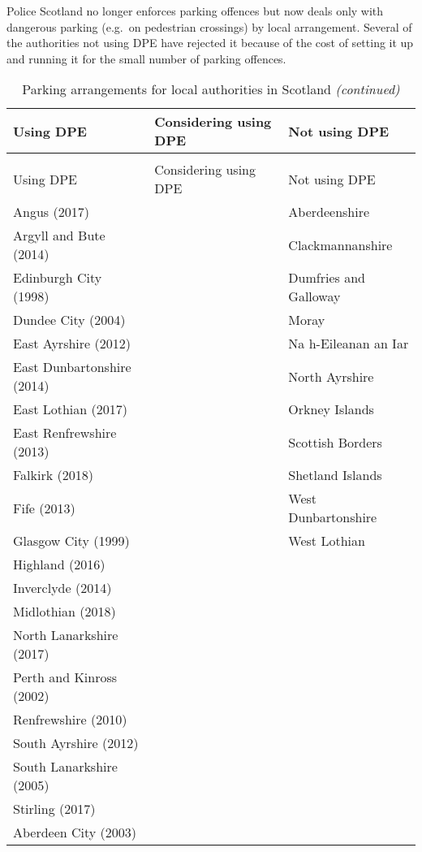 \documentclass[
  12pt,
]{article}
\begin{document}
Police Scotland no longer enforces parking offences but now deals only with dangerous parking (e.g.~on pedestrian crossings) by local arrangement. Several of the authorities not using DPE have rejected it because of the cost of setting it up and running it for the small number of parking offences.

\begingroup\fontsize{10}{12}\selectfont

\begin{longtable}[t]{lll}
\caption{\label{tab:dpe}Parking arrangements for local authorities in Scotland}\\
\toprule
Using DPE & Considering using DPE & Not using DPE\\
\midrule
\endfirsthead
\caption[]{\label{tab:dpe}Parking arrangements for local authorities in Scotland \textit{(continued)}}\\
\toprule
Using DPE & Considering using DPE & Not using DPE\\
\midrule
\endhead

\endfoot
\bottomrule
\endlastfoot
Angus (2017) &  & Aberdeenshire\\
Argyll and Bute (2014) &  & Clackmannanshire\\
Edinburgh City (1998) &  & Dumfries and Galloway\\
Dundee City (2004) &  & Moray\\
East Ayrshire (2012) &  & Na h-Eileanan an Iar\\
East Dunbartonshire (2014) &  & North Ayrshire\\
East Lothian (2017) &  & Orkney Islands\\
East Renfrewshire (2013) &  & Scottish Borders\\
Falkirk (2018) &  & Shetland Islands\\
Fife (2013) &  & West Dunbartonshire\\
Glasgow City (1999) &  & West Lothian\\
Highland (2016) &  & \\
Inverclyde (2014) &  & \\
Midlothian (2018) &  & \\
North Lanarkshire (2017) &  & \\
Perth and Kinross (2002) &  & \\
Renfrewshire (2010) &  & \\
South Ayrshire (2012) &  & \\
South Lanarkshire (2005) &  & \\
Stirling (2017) &  & \\
Aberdeen City (2003) &  & \\*
\end{longtable}
\endgroup{}
\end{document}
